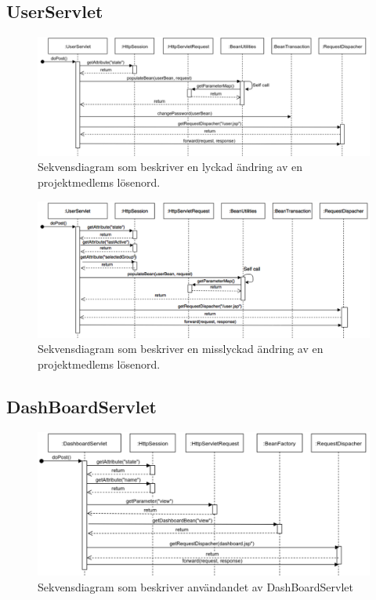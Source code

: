 \documentclass[paper=a4, fontsize=11pt,twoside]{article}
\begin{document}
\subsection{UserServlet}

\begin{figure}[H]
\centering
\includegraphics[width=175mm]{UserServlet}
\caption{Sekvensdiagram som beskriver en lyckad ändring av en projektmedlems lösenord.}
\end{figure}

\begin{figure}[H]
\centering
\includegraphics[width=175mm]{UserServletFailed}
\caption{Sekvensdiagram som beskriver en misslyckad ändring av en projektmedlems lösenord. }
\end{figure}

\subsection{DashBoardServlet}

\begin{figure}[H]
\centering
\includegraphics[width=175mm]{DashBoardServlet}
\caption{Sekvensdiagram som beskriver användandet av DashBoardServlet}
\end{figure}
\end{document}
